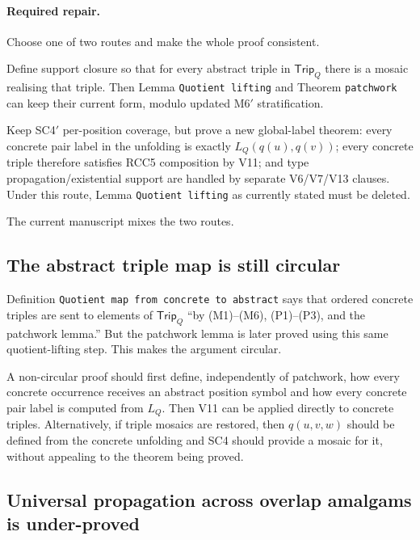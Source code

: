 \documentclass[11pt]{article}
\newcommand{\Trip}{\mathsf{Trip}}
\begin{document}
\paragraph{Required repair.}
Choose one of two routes and make the whole proof consistent.

\begin{description}[leftmargin=2em]
  \item[Route A: restore triple coverage.]  Define support closure so that for
  every abstract triple in $\Trip_Q$ there is a mosaic realising that triple.
  Then Lemma \texttt{Quotient lifting} and Theorem \texttt{patchwork} can keep
  their current form, modulo updated M6$'$ stratification.

  \item[Route B: remove triple-mosaic dependence.]  Keep SC4$'$ per-position
  coverage, but prove a new global-label theorem: every concrete pair label in
  the unfolding is exactly $L_Q(q(u),q(v))$; every concrete triple therefore
  satisfies RCC5 composition by V11; and type propagation/existential support
  are handled by separate V6/V7/V13 clauses.  Under this route, Lemma
  \texttt{Quotient lifting} as currently stated must be deleted.
\end{description}
The current manuscript mixes the two routes.

\subsection{The abstract triple map is still circular}

Definition \texttt{Quotient map from concrete to abstract} says that ordered
concrete triples are sent to elements of $\Trip_Q$ ``by (M1)--(M6), (P1)--(P3),
and the patchwork lemma.''  But the patchwork lemma is later proved using this
same quotient-lifting step.  This makes the argument circular.

A non-circular proof should first define, independently of patchwork, how every
concrete occurrence receives an abstract position symbol and how every concrete
pair label is computed from $L_Q$.  Then V11 can be applied directly to concrete
triples.  Alternatively, if triple mosaics are restored, then $q(u,v,w)$ should
be defined from the concrete unfolding and SC4 should provide a mosaic for it,
without appealing to the theorem being proved.

\subsection{Universal propagation across overlap amalgams is under-proved}
\end{document}
